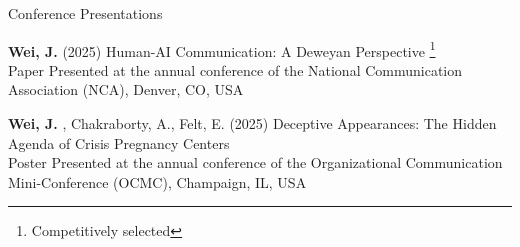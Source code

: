 \documentclass[
	11pt, %
]{resume} %
\begin{document}



\begin{rSection}{Conference Presentations} 

    \textbf {Wei, J.} (2025) Human-AI Communication: A Deweyan Perspective%
    {\renewcommand{\thefootnote}{\fnsymbol{footnote}}\setcounter{footnote}{0}\footnote{Competitively selected}}\\
\textbullet\enspace Paper Presented at the annual conference of the National Communication Association (NCA), Denver, CO, USA

    \par\smallskip
	\textbf{Wei, J.} , Chakraborty, A., Felt, E. (2025) Deceptive Appearances: The Hidden Agenda of Crisis Pregnancy Centers \\
\textbullet\enspace Poster Presented at the annual conference of the Organizational Communication Mini-Conference (OCMC), Champaign, IL, USA
	
\end{rSection}



\end{document}
